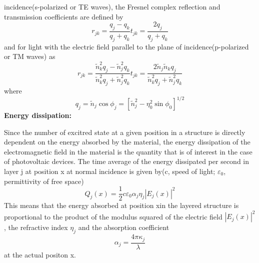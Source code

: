 \documentclass{article}
\begin{document}
incidence(s-polarized or TE waves), the Fresnel complex reflection and
transmission coefficients are defined by
\begin{subequations}
\begin{equation}
{{r}_{jk}}=\frac{{{q}_{j}}-{{q}_{k}}}{{{q}_{j}}+{{q}_{k}}}
\end{equation}
\begin{equation}
{{t}_{jk}}=\frac{2{{q}_{j}}}{{{q}_{j}}+{{q}_{k}}}
\end{equation}
\end{subequations}
and for light with the electric field parallel to the plane of
incidence(p-polarized or TM waves) as
\begin{subequations}
\begin{equation}
{{r}_{jk}}=\frac{\tilde{n}_{k}^{2}{{q}_{j}}-\tilde{n}_{j}^{2}{{q}_{k}}}{\tilde{n}_{k}^{2}{{q}_{j}}+\tilde{n}_{j}^{2}{{q}_{k}}}
\end{equation}
\begin{equation}
{{t}_{jk}}=\frac{2{{{\tilde{n}}}_{j}}{{{\tilde{n}}}_{k}}{{q}_{j}}}{\tilde{n}_{k}^{2}{{q}_{j}}+\tilde{n}_{j}^{2}{{q}_{k}}}
\end{equation}
\end{subequations}
where
\begin{equation}
{{q}_{j}}={{\tilde{n}}_{j}}\cos {{\phi }_{j}}={{[\tilde{n}_{j}^{2}-\eta
_{0}^{2}\sin {{\phi }_{0}}]}^{1/2}}
\end{equation}
\textbf{Energy dissipation:}

Since the number of excitred state at a given position in a structure is
directly dependent on the energy absorbed by the material, the energy
dissipation of the electromagnetic field in the material is the quantity that is
of interest in the case of photovoltaic devices. The time average of the energy
dissipated per second in layer j at position x at normal incidence is given
by(c, speed of light; ${{\varepsilon }_{0}}$, permittivity of free space)
\begin{equation}
{{Q}_{j}}(x)=\frac{1}{2}c{{\varepsilon }_{0}}{{\alpha }_{j}}{{\eta
}_{j}}{{\left| {{E}_{j}}(x) \right|}^{2}}
\end{equation}
This means that the energy absorbed at position xin the layered structure is
proportional to the product of the modulus squared of the electric field
${{\left| {{E}_{j}}(x) \right|}^{2}}$, the refractive index ${{\eta }_{j}}$ and
the absorption coefficient
\begin{equation}
{{\alpha }_{j}}=\frac{4\pi {{\kappa }_{j}}}{\lambda }
\end{equation}
at the actual positon x.
\end{document}

